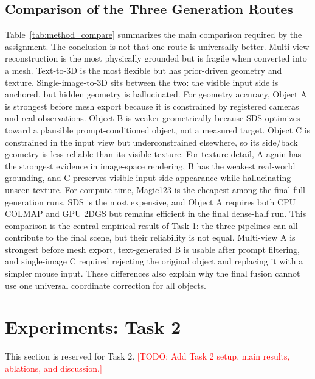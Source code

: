 \documentclass[10pt,twocolumn,letterpaper]{article}
\newcommand{\todo}[1]{\textcolor{red}{[TODO: #1]}}
\begin{document}
\subsection{Comparison of the Three Generation Routes}
Table~\ref{tab:method_compare} summarizes the main comparison required by the assignment.
The conclusion is not that one route is universally better.
Multi-view reconstruction is the most physically grounded but is fragile when converted into a mesh.
Text-to-3D is the most flexible but has prior-driven geometry and texture.
Single-image-to-3D sits between the two: the visible input side is anchored, but hidden geometry is hallucinated.
For geometry accuracy, Object A is strongest before mesh export because it is constrained by registered cameras and real observations.
Object B is weaker geometrically because SDS optimizes toward a plausible prompt-conditioned object, not a measured target.
Object C is constrained in the input view but underconstrained elsewhere, so its side/back geometry is less reliable than its visible texture.
For texture detail, A again has the strongest evidence in image-space rendering, B has the weakest real-world grounding, and C preserves visible input-side appearance while hallucinating unseen texture.
For compute time, Magic123 is the cheapest among the final full generation runs, SDS is the most expensive, and Object A requires both CPU COLMAP and GPU 2DGS but remains efficient in the final dense-half run.
This comparison is the central empirical result of Task 1: the three pipelines can all contribute to the final scene, but their reliability is not equal.
Multi-view A is strongest before mesh export, text-generated B is usable after prompt filtering, and single-image C required rejecting the original object and replacing it with a simpler mouse input.
These differences also explain why the final fusion cannot use one universal coordinate correction for all objects.

\FloatBarrier

\section{Experiments: Task 2}
This section is reserved for Task 2.
\todo{Add Task 2 setup, main results, ablations, and discussion.}
\end{document}
